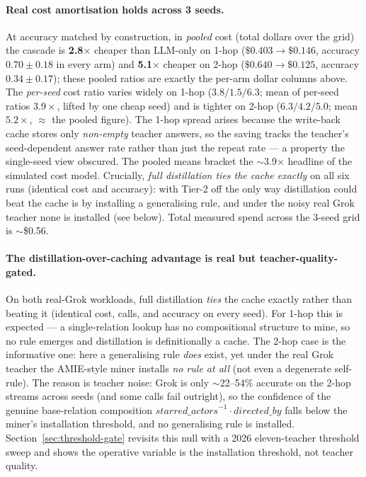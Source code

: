 \documentclass[11pt]{article}
\theoremstyle{plain}
\newcommand{\costFactor}{3.9}
\begin{document}
\paragraph{Real cost amortisation holds across 3 seeds.} At accuracy matched by
construction, in \emph{pooled} cost (total dollars over the grid) the cascade is
\textbf{2.8$\times$} cheaper than LLM-only on
1-hop ($\$0.403\!\to\!\$0.146$, accuracy $0.70\pm0.18$ in every arm) and
\textbf{5.1$\times$} cheaper on 2-hop ($\$0.640\!\to\!\$0.125$, accuracy
$0.34\pm0.17$); these pooled ratios are exactly the per-arm dollar columns above.
The \emph{per-seed} cost ratio varies widely on 1-hop ($3.8/1.5/6.3$; mean of
per-seed ratios $3.9\times$, lifted by one cheap seed) and is tighter on 2-hop
($6.3/4.2/5.0$; mean $5.2\times$, $\approx$ the pooled figure). The 1-hop spread
arises because the write-back cache stores only \emph{non-empty} teacher answers,
so the saving tracks the teacher's seed-dependent answer rate rather than just
the repeat rate --- a property the single-seed view obscured. The pooled means
bracket the $\sim$\costFactor$\times$ headline of the simulated cost model.
Crucially, \emph{full distillation ties
the cache exactly} on all six runs (identical cost and accuracy): with Tier-2
off the only way distillation could beat the cache is by installing a
generalising rule, and under the noisy real Grok teacher none is installed (see
below). Total measured spend across the 3-seed grid is $\sim$\$0.56.

\paragraph{The distillation-over-caching advantage is real but
teacher-quality-gated.} On both real-Grok workloads, full distillation
\emph{ties} the cache exactly rather than beating it (identical cost, calls, and
accuracy on every seed). For 1-hop this is expected --- a single-relation
lookup has no compositional structure to mine, so no rule emerges and
distillation is definitionally a cache. The 2-hop case is the informative one:
here a generalising rule \emph{does} exist, yet under the real Grok teacher the
AMIE-style miner installs \emph{no rule at all} (not even a degenerate
self-rule). The reason is teacher noise: Grok is only $\sim$22--54\% accurate on
the 2-hop streams across seeds (and some calls fail outright), so the confidence
of the genuine base-relation composition
$\mathit{starred\_actors}^{-1}\cdot\mathit{directed\_by}$ falls below the
miner's installation threshold, and no generalising rule is installed.
Section~\ref{sec:threshold-gate} revisits this null with a 2026 eleven-teacher
threshold sweep and shows the operative variable is the installation threshold,
not teacher quality.
\end{document}

